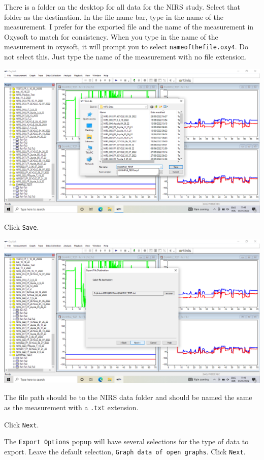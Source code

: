 \documentclass[
]{book}
\begin{document}
There is a folder on the desktop for all data for the NIRS study. Select that folder as the destination. In the file name bar, type in the name of the measurement. I prefer for the exported file and the name of the measurement in Oxysoft to match for consistency. When you type in the name of the measurement in oxysoft, it will prompt you to select \texttt{nameofthefile.oxy4}. Do not select this. Just type the name of the measurement with no file extension.

\includegraphics[width=1\linewidth]{images/exportmeasurement/5_nameexportfile}

Click \texttt{Save}.

\includegraphics[width=1\linewidth]{images/exportmeasurement/6_chosenfilelocation}

The file path should be to the NIRS data folder and should be named the same as the measurement with a \texttt{.txt} extension.

Click \texttt{Next}.

The \texttt{Export\ Options} popup will have several selections for the type of data to export. Leave the default selection, \texttt{Graph\ data\ of\ open\ graphs}. Click \texttt{Next}.
\end{document}
